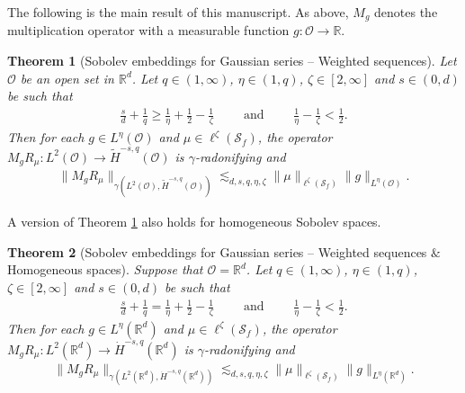 \documentclass[reqno]{amsart}
\theoremstyle{plain}
\newtheorem{theorem}{Theorem}[section]
\theoremstyle{remark}
\theoremstyle{plain}
\numberwithin{equation}{section}
\def\R{{\mathbb R}}
\newcommand{\Domm}{\mathcal{O}}
\newcommand{\wt}{\widetilde}
\newcommand{\1}{\one}
\newcommand{\Sf}{\mathcal{S}_{f}}
\begin{document}
\smallskip

The following is the main result of this manuscript. As above, $M_g$ denotes the multiplication operator with a measurable function $g:\Domm\to \R$.


\begin{theorem}[Sobolev embeddings for Gaussian series -- Weighted sequences]
\label{thm:MgTmu delta}
Let $\Domm$ be an open set in $\R^d$. 
Let $q\in (1, \infty)$, $\eta\in (1, q)$, $\zeta\in [2, \infty]$
and $s\in(0,d)$ be such that 
\begin{align}\label{eq:conditionsmain delta}
\frac{s}{d} + \frac{1}{q}  \geq \frac{1}{\eta} + \frac{1}{2} - \frac{1}{\zeta}\qquad \text{ and }\qquad 
\frac{1}{\eta} - \frac{1}{\zeta}<\frac{1}{2}.
\end{align}
Then for each $g\in L^{\eta}(\mathcal{O})$ and $\mu\in \ell^\zeta(\Sf)$, the operator 
$M_g R_{\mu}:L^2(\mathcal{O})\to \wt{H}^{-s,q}(\mathcal{O})$ is $\gamma$-radonifying
and 
\begin{align}\label{eq:maingammabound}
\|M_g R_{\mu}\|_{\gamma(L^2(\mathcal{O}), \wt{H}^{-s,q}(\mathcal{O}))}\lesssim_{d,s,q,\eta,\zeta} \|\mu\|_{\ell^{\zeta}(\Sf)} \|g\|_{L^{\eta}(\mathcal{O})}.
\end{align} 
\end{theorem}


A version of Theorem \ref{thm:MgTmu delta} also holds for homogeneous Sobolev spaces.

\begin{theorem}[Sobolev embeddings for Gaussian series -- Weighted sequences $\&$ Homogeneous spaces]
\label{thm:MgTmu delta_hom}
Suppose that $\Domm=\R^d$. 
Let $q\in (1, \infty)$, $\eta\in (1, q)$, $\zeta\in [2, \infty]$ and $s\in(0,d)$ be such that 
\begin{align}\label{eq:conditionsmain delta_hom}
\frac{s}{d} + \frac{1}{q}  = \frac{1}{\eta} + \frac{1}{2} - \frac{1}{\zeta}\qquad \text{ and }\qquad 
\frac{1}{\eta} - \frac{1}{\zeta}<\frac{1}{2}.
\end{align}
Then for each $g\in L^{\eta}(\R^d)$ and $\mu\in \ell^\zeta(\Sf)$, the operator 
$M_g R_{\mu}:L^2(\R^d)\to \dot{H}^{-s,q}(\R^d)$ is $\gamma$-radonifying and 
\begin{align}\label{eq:maingammabound_hom}
\|M_g R_{\mu}\|_{\gamma(L^2(\R^d),\dot{H}^{-s,q}(\R^d))}\lesssim_{d,s,q,\eta,\zeta}
 \|\mu\|_{\ell^{\zeta}(\Sf)} \|g\|_{L^{\eta}(\R^d)}.
\end{align} 
\end{theorem}
\end{document}
